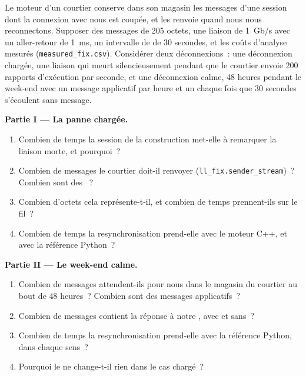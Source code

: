 \begin{problem}\label{pb:ll:protocols-i-fix:1}
Le moteur d'un courtier conserve dans son magasin les messages d'une session dont la connexion avec nous est coupée, et les renvoie quand
nous nous reconnectons. Supposer des messages de 205 octets, une liaison de 1~Gb/s avec un aller-retour de \qty{1}{\milli\second}, un intervalle de  de
30 secondes, et les coûts d'analyse mesurés (\texttt{measured\_fix.csv}). Considérer deux déconnexions~: une déconnexion chargée, une liaison qui
meurt silencieusement pendant que le courtier envoie 200 rapports d'exécution par seconde, et une déconnexion calme, 48 heures pendant le week-end avec un
message applicatif par heure et un  chaque fois que 30 secondes s'écoulent sans message.

\medskip\noindent\textbf{Partie I --- La panne chargée.}
\begin{enumerate}
\item Combien de temps la session de la construction met-elle à remarquer la liaison morte, et pourquoi~?
\item Combien de messages le courtier doit-il renvoyer (\texttt{ll\_fix.sender\_stream})~? Combien sont des ~?
\item Combien d'octets cela représente-t-il, et combien de temps prennent-ils sur le fil~?
\item Combien de temps la resynchronisation prend-elle avec le moteur C++, et avec la référence Python~?
\end{enumerate}

\medskip\noindent\textbf{Partie II --- Le week-end calme.}
\begin{enumerate}[resume]
\item Combien de messages attendent-ils pour nous dans le magasin du courtier au bout de 48 heures~? Combien sont des messages applicatifs~?
\item Combien de messages contient la réponse à notre , avec  et sans~?
\item Combien de temps la resynchronisation prend-elle avec la référence Python, dans chaque sens~?
\item Pourquoi le  ne change-t-il rien dans le cas chargé~?
\end{enumerate}


\end{problem}
